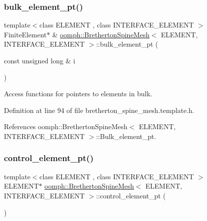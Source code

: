 \subsubsection{\texorpdfstring{bulk\+\_\+element\+\_\+pt()}{bulk\_element\_pt()}}
{\footnotesize\ttfamily template$<$class E\+L\+E\+M\+E\+NT , class I\+N\+T\+E\+R\+F\+A\+C\+E\+\_\+\+E\+L\+E\+M\+E\+NT $>$ \\
Finite\+Element$\ast$ \& \hyperlink{classoomph_1_1BrethertonSpineMesh}{oomph\+::\+Bretherton\+Spine\+Mesh}$<$ E\+L\+E\+M\+E\+NT, I\+N\+T\+E\+R\+F\+A\+C\+E\+\_\+\+E\+L\+E\+M\+E\+NT $>$\+::bulk\+\_\+element\+\_\+pt (\begin{DoxyParamCaption}\item[{const unsigned long \&}]{i }\end{DoxyParamCaption})\hspace{0.3cm}{\ttfamily [inline]}}



Access functions for pointers to elements in bulk. 



Definition at line 94 of file bretherton\+\_\+spine\+\_\+mesh.\+template.\+h.



References oomph\+::\+Bretherton\+Spine\+Mesh$<$ E\+L\+E\+M\+E\+N\+T, I\+N\+T\+E\+R\+F\+A\+C\+E\+\_\+\+E\+L\+E\+M\+E\+N\+T $>$\+::\+Bulk\+\_\+element\+\_\+pt.

\mbox{\label{classoomph_1_1BrethertonSpineMesh_a9b02893724c76098f75d9285e9985f4b}} 
\subsubsection{\texorpdfstring{control\+\_\+element\+\_\+pt()}{control\_element\_pt()}}
{\footnotesize\ttfamily template$<$class E\+L\+E\+M\+E\+NT , class I\+N\+T\+E\+R\+F\+A\+C\+E\+\_\+\+E\+L\+E\+M\+E\+NT $>$ \\
E\+L\+E\+M\+E\+NT$\ast$ \hyperlink{classoomph_1_1BrethertonSpineMesh}{oomph\+::\+Bretherton\+Spine\+Mesh}$<$ E\+L\+E\+M\+E\+NT, I\+N\+T\+E\+R\+F\+A\+C\+E\+\_\+\+E\+L\+E\+M\+E\+NT $>$\+::control\+\_\+element\+\_\+pt (\begin{DoxyParamCaption}{ }\end{DoxyParamCaption})\hspace{0.3cm}{\ttfamily [inline]}}



